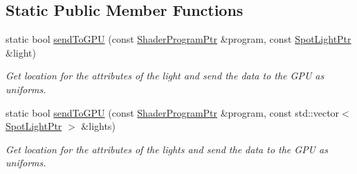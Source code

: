 \subsection*{Static Public Member Functions}
\begin{DoxyCompactItemize}
\item 
static bool \hyperlink{classSpotLight_a99eb20c31e4e7fda4d2c695c96bb5d3a}{send\+To\+G\+P\+U} (const \hyperlink{ShaderProgram_8hpp_af8e4af1ad4c53875ee5d32ab7e1f4966}{Shader\+Program\+Ptr} \&program, const \hyperlink{classSpotLight_ac20419604c70594b85e7c019effd1998}{Spot\+Light\+Ptr} \&light)
\begin{DoxyCompactList}\small\item\em Get location for the attributes of the light and send the data to the G\+P\+U as uniforms. \end{DoxyCompactList}\item 
static bool \hyperlink{classSpotLight_aa137cccf70b2eff8f7a2a188553ec818}{send\+To\+G\+P\+U} (const \hyperlink{ShaderProgram_8hpp_af8e4af1ad4c53875ee5d32ab7e1f4966}{Shader\+Program\+Ptr} \&program, const std\+::vector$<$ \hyperlink{classSpotLight_ac20419604c70594b85e7c019effd1998}{Spot\+Light\+Ptr} $>$ \&lights)
\begin{DoxyCompactList}\small\item\em Get location for the attributes of the lights and send the data to the G\+P\+U as uniforms. \end{DoxyCompactList}\end{DoxyCompactItemize}
